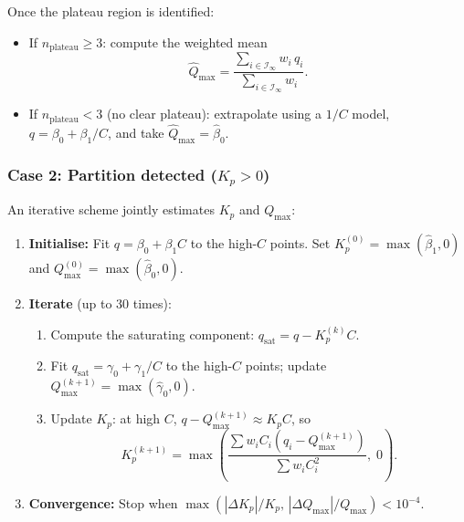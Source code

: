 \documentclass[12pt]{article}
\begin{document}
Once the plateau region is identified:
\begin{itemize}[nosep]
  \item If $n_{\mathrm{plateau}} \ge 3$: compute the weighted mean
        \begin{equation}
          \widehat{Q}_{\max}
          = \frac{\sum_{i\in\mathcal{I}_\infty} w_i\, q_i}
                 {\sum_{i\in\mathcal{I}_\infty} w_i}.
          \label{eq:Qmax_wmean}
        \end{equation}
  \item If $n_{\mathrm{plateau}} < 3$ (no clear plateau): extrapolate
        using a $1/C$ model,
        $q = \beta_0 + \beta_1/C$, and take
        $\widehat{Q}_{\max} = \hat{\beta}_0$.
\end{itemize}

\subsubsection{Case 2: Partition detected ($K_p > 0$)}

An iterative scheme jointly estimates $K_p$ and $Q_{\max}$:
\begin{enumerate}[nosep]
  \item \textbf{Initialise:} Fit $q = \beta_0 + \beta_1 C$ to the
        high-$C$ points.  Set $K_p^{(0)} = \max(\hat{\beta}_1, 0)$
        and $Q_{\max}^{(0)} = \max(\hat{\beta}_0, 0)$.
  \item \textbf{Iterate} (up to 30 times):
    \begin{enumerate}[nosep]
      \item Compute the saturating component:
            $q_{\mathrm{sat}} = q - K_p^{(k)} C$.
      \item Fit $q_{\mathrm{sat}} = \gamma_0 + \gamma_1/C$ to the
            high-$C$ points; update
            $Q_{\max}^{(k+1)} = \max(\hat{\gamma}_0, 0)$.
      \item Update $K_p$: at high $C$,
            $q - Q_{\max}^{(k+1)} \approx K_p C$, so
            \begin{equation}
              K_p^{(k+1)} = \max\!\left(
              \frac{\sum w_i C_i (q_i - Q_{\max}^{(k+1)})}
                   {\sum w_i C_i^2},\; 0\right).
            \end{equation}
    \end{enumerate}
  \item \textbf{Convergence:} Stop when
        $\max(|\Delta K_p|/K_p,\, |\Delta Q_{\max}|/Q_{\max}) < 10^{-4}$.
\end{enumerate}
\end{document}
